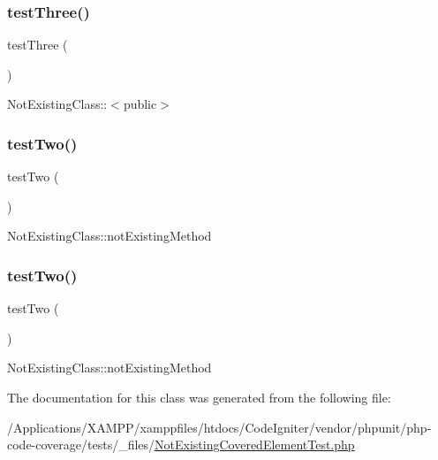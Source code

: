 \subsubsection{\texorpdfstring{test\+Three()}{testThree()}\hspace{0.1cm}{\footnotesize\ttfamily [2/2]}}
{\footnotesize\ttfamily test\+Three (\begin{DoxyParamCaption}{ }\end{DoxyParamCaption})}

Not\+Existing\+Class\+:\+:$<$public$>$ \mbox{\label{class_not_existing_covered_element_test_a4fb9974ce113d5d1db8075e0db0dc9b6}} 
\subsubsection{\texorpdfstring{test\+Two()}{testTwo()}\hspace{0.1cm}{\footnotesize\ttfamily [1/2]}}
{\footnotesize\ttfamily test\+Two (\begin{DoxyParamCaption}{ }\end{DoxyParamCaption})}

Not\+Existing\+Class\+::not\+Existing\+Method \mbox{\label{class_not_existing_covered_element_test_a4fb9974ce113d5d1db8075e0db0dc9b6}} 
\subsubsection{\texorpdfstring{test\+Two()}{testTwo()}\hspace{0.1cm}{\footnotesize\ttfamily [2/2]}}
{\footnotesize\ttfamily test\+Two (\begin{DoxyParamCaption}{ }\end{DoxyParamCaption})}

Not\+Existing\+Class\+::not\+Existing\+Method 

The documentation for this class was generated from the following file\+:\begin{DoxyCompactItemize}
\item 
/\+Applications/\+X\+A\+M\+P\+P/xamppfiles/htdocs/\+Code\+Igniter/vendor/phpunit/php-\/code-\/coverage/tests/\+\_\+files/\mbox{\hyperlink{php-code-coverage_2tests_2__files_2_not_existing_covered_element_test_8php}{Not\+Existing\+Covered\+Element\+Test.\+php}}\end{DoxyCompactItemize}
